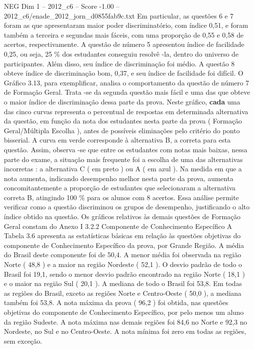\begin{textsample}{NEG Dim 1 – 2012\_c6 – Score -1.00 – 2012\_c6/enade\_2012\_jorn\_d0855fab9c.txt}
Em particular, as questões 6 e 7 foram as que apresentaram maior poder discriminatório, com índice 0,51, e foram também a terceira e segundas mais fáceis, com uma proporção de 0,55 e 0,58 de acertos, respectivamente.
A questão de número 5 apresentou índice de facilidade 0,25, ou seja, 25 \% dos estudantes conseguiu resolvê -la, dentro do universo de participantes.
Além disso, seu índice de discriminação foi médio.
A questão 8 obteve índice de discriminação bom, 0,37, e seu índice de facilidade foi difícil.
O Gráfico 3.13, para exemplificar, analisa o comportamento da questão de número 7 de Formação Geral.
Trata -se da segunda questão mais fácil e uma das que obteve o maior índice de discriminação dessa parte da prova.
Neste gráfico, \textbf{cada} uma das cinco curvas representa o percentual de respostas em determinada alternativa da questão, em função da nota dos estudantes nesta parte da prova ( Formação Geral/Múltipla Escolha ), antes de possíveis eliminações pelo critério do ponto bisserial.
A curva em verde corresponde à alternativa B, a correta para esta questão.
Assim, observa -se que entre os estudantes com notas mais baixas, nessa parte do exame, a situação mais frequente foi a escolha de uma das alternativas incorretas : a alternativa C ( em preto ) ou A ( em azul ).
Na medida em que a nota aumenta, indicando desempenho melhor nesta parte da prova, aumenta concomitantemente a proporção de estudantes que selecionaram a alternativa correta B, atingindo 100 \% para os alunos com 8 acertos.
Essa análise permite verificar como a questão discriminou os grupos de desempenho, justificando o alto índice obtido na questão.
Os gráficos relativos às demais questões de Formação Geral constam do Anexo I 3.2.2 Componente de Conhecimento Específico A Tabela 3.6 apresenta as estatísticas básicas em relação às questões objetivas do componente de Conhecimento Específico da prova, por Grande Região.
A média do Brasil deste componente foi de 50,4.
A menor média foi observada na região Norte ( 48,8 ) e a maior na região Nordeste ( 52,1 ).
O desvio padrão de todo o Brasil foi 19,1, sendo o menor desvio padrão encontrado na região Norte ( 18,1 ) e o maior na região Sul ( 20,1 ).
A mediana de todo o Brasil foi 53,8.
Em todas as regiões do Brasil, exceto as regiões Norte e Centro-Oeste ( 50,0 ), a mediana também foi 53,8.
A nota máxima da prova ( 96,2 ) foi obtida, nas questões objetivas do componente de Conhecimento Específico, por pelo menos um aluno da região Sudeste.
A nota máxima nas demais regiões foi 84,6 no Norte e 92,3 no Nordeste, no Sul e no Centro-Oeste.
A nota mínima foi zero em todas as regiões, sem exceção.

\end{textsample}
